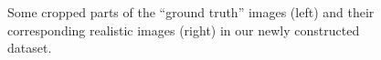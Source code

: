 \begin{figure}
{\begin{minipage}[t]{0.24\textwidth}
\end{minipage}
\begin{minipage}[t]{0.24\textwidth}
\centering
{}
\end{minipage}
\begin{minipage}[t]{0.24\textwidth}
\centering
{}
\end{minipage}
}
    \caption{Some cropped parts of the ``ground truth'' images (left) and their corresponding realistic images (right) in our newly constructed dataset.}
    \label{fig6-4}
\end{figure}

